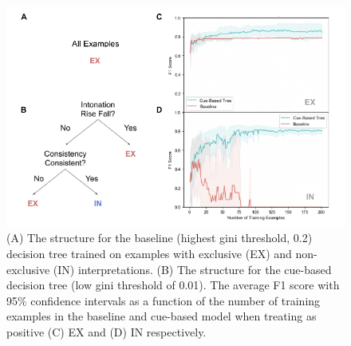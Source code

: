 \documentclass[,man,floatsintext]{apa6}
\begin{document}
\begin{figure}
\centering
\includegraphics{figs/binaryBaseline-1.pdf}
\caption{\label{fig:binaryBaseline}(A) The structure for the baseline (highest gini threshold, 0.2) decision tree trained on examples with exclusive (EX) and non-exclusive (IN) interpretations. (B) The structure for the cue-based decision tree (low gini threshold of 0.01). The average F1 score with 95\% confidence intervals as a function of the number of training examples in the baseline and cue-based model when treating as positive (C) EX and (D) IN respectively.}
\end{figure}
\end{document}
